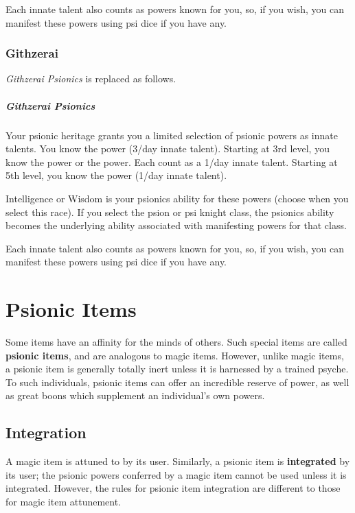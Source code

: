     Each innate talent also counts as powers known for you,
    so, if you wish,
    you can manifest these powers using psi dice if you have any.

\subsubsection{Githzerai}
\emph{Githzerai Psionics} is replaced as follows.
\subparagraph{Githzerai Psionics}
    Your psionic heritage grants you a limited selection of
    psionic powers as innate talents.    
    You know the  power (3/day innate talent).
    Starting at 3rd level,
    you know the  power or the
     power.
    Each count as a 1/day innate talent.
    Starting at 5th level,
    you know the  power (1/day innate talent).

    Intelligence or Wisdom is your psionics ability for these powers
    (choose when you select this race).
    If you select the psion or psi knight class,
    the psionics ability becomes the underlying ability
    associated with manifesting powers for that class.

    Each innate talent also counts as powers known for you,
    so, if you wish,
    you can manifest these powers using psi dice if you have any.

\section{Psionic Items}
\label{sec:psionic_items}
Some items have an affinity for the minds of others.
Such special items are called \textbf{psionic items},
and are analogous to magic items.
However, unlike magic items,
a psionic item is generally totally inert unless
it is harnessed by a trained psyche.
To such individuals,
psionic items can offer an incredible reserve of power,
as well as great boons which supplement an individual's own powers.

\subsection{Integration}
A magic item is attuned to by its user.
Similarly, a psionic item is \textbf{integrated} by its user;
the psionic powers conferred by a magic item cannot be used
unless it is integrated.
However, the rules for psionic item integration are different to
those for magic item attunement.

